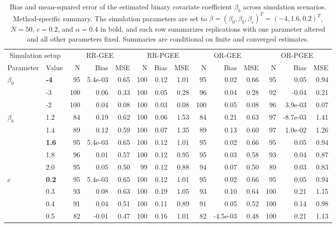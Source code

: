 \begin{table}[htbp]
\centering
\scriptsize
\setlength{\tabcolsep}{4pt}
\renewcommand{\arraystretch}{1.15}
\caption{Bias and mean-squared error of the estimated binary covariate coefficient $\beta_b$ across simulation scenarios. Method-specific summary. The simulation parameters are set to $\beta = (\beta_0, \beta_b, \beta_c)^T = (-4, 1.6, 0.2)^T$, $N = 50$, $c = 0.2$, and $\alpha = 0.4$ in bold, and each row summarizes replications with one parameter altered and all other parameters fixed. Summaries are conditional on finite and converged estimates.}
\begin{tabular}{ll|rrr|rrr|rrr|rrr}
\hline
\multicolumn{2}{c|}{Simulation setup} & \multicolumn{3}{c|}{RR-GEE} & \multicolumn{3}{c|}{RR-PGEE} & \multicolumn{3}{c|}{OR-GEE} & \multicolumn{3}{c}{OR-PGEE} \\
Parameter & Value & N & Bias & MSE & N & Bias & MSE & N & Bias & MSE & N & Bias & MSE \\
\hline
$\beta_0$ & \textbf{-4} & 95 & 5.4e-03 & 0.65 & 100 & 0.12 & 1.01 & 95 & 0.02 & 0.66 & 95 & 0.05 & 0.94 \\
 & -3 & 100 & 0.06 & 0.33 & 100 & 0.05 & 0.28 & 96 & 0.04 & 0.28 & 92 & -0.04 & 0.21 \\
 & -2 & 100 & 0.04 & 0.08 & 100 & 0.03 & 0.08 & 100 & 0.05 & 0.08 & 96 & 3.9e-03 & 0.07 \\
\hline
$\beta_b$ & 1.2 & 84 & 0.19 & 0.62 & 100 & 0.06 & 1.53 & 84 & 0.21 & 0.63 & 97 & -8.7e-03 & 1.41 \\
 & 1.4 & 89 & 0.12 & 0.59 & 100 & 0.07 & 1.35 & 89 & 0.13 & 0.60 & 97 & 1.0e-02 & 1.26 \\
 & \textbf{1.6} & 95 & 5.4e-03 & 0.65 & 100 & 0.12 & 1.01 & 95 & 0.02 & 0.66 & 95 & 0.05 & 0.94 \\
 & 1.8 & 96 & 0.01 & 0.57 & 100 & 0.12 & 0.95 & 95 & 0.03 & 0.58 & 93 & 0.04 & 0.87 \\
 & 2.0 & 95 & 0.05 & 0.50 & 99 & 0.12 & 0.88 & 94 & 0.07 & 0.50 & 89 & 0.03 & 0.83 \\
\hline
$c$ & \textbf{0.2} & 95 & 5.4e-03 & 0.65 & 100 & 0.12 & 1.01 & 95 & 0.02 & 0.66 & 95 & 0.05 & 0.94 \\
 & 0.3 & 93 & 0.08 & 0.63 & 100 & 0.19 & 1.05 & 93 & 0.10 & 0.64 & 100 & 0.21 & 1.15 \\
 & 0.4 & 91 & 0.04 & 0.51 & 100 & 0.11 & 0.89 & 91 & 0.05 & 0.52 & 100 & 0.14 & 0.98 \\
 & 0.5 & 82 & -0.01 & 0.47 & 100 & 0.16 & 1.01 & 82 & -4.5e-03 & 0.48 & 100 & 0.21 & 1.13 \\

\end{tabular}
\end{table}
